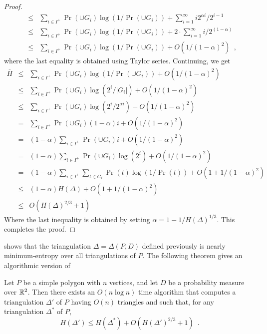 \documentclass[lotsofwhite]{patmorin}
\begin{document}
\begin{proof}
\begin{eqnarray*}
 & \le & \sum_{i\in I^+}\Pr(\cup G_{i})\log(1/\Pr(\cup G_{i})) 
         + \sum_{i=1}^\infty i2^{\alpha i}/2^{i-1} \\
 & \le & \sum_{i\in I^+}\Pr(\cup G_{i})\log(1/\Pr(\cup G_{i})) 
         + 2\cdot\sum_{i=1}^{\infty} i/2^{(1-\alpha)} \\
 & \le & \sum_{i\in I^+}\Pr(\cup G_{i})\log(1/\Pr(\cup G_{i})) 
         + O(1/(1-\alpha)^2) \enspace ,
\end{eqnarray*}
where the last equality is obtained using Taylor series.
Continuing, we get 
\begin{eqnarray*}
\overline H
  & \le & \sum_{i\in I^+}\Pr(\cup G_{i})\log(1/\Pr(\cup G_{i})) 
         + O(1/(1-\alpha)^2) \\
  & \le & \sum_{i\in I^+}\Pr(\cup G_{i})\log(2^i/|G_i|)
         + O(1/(1-\alpha)^2) \\
  & \le & \sum_{i\in I^+}\Pr(\cup G_{i})\log(2^i/2^{\alpha i})
         + O(1/(1-\alpha)^2) \\
  &  =  & \sum_{i\in I^+}\Pr(\cup G_{i})(1-\alpha) i
         + O(1/(1-\alpha)^2) \\
  &  =  & (1-\alpha)\sum_{i\in I^+}\Pr(\cup G_{i}) i
         + O(1/(1-\alpha)^2) \\
  &  =  & (1-\alpha)\sum_{i\in I^+}\Pr(\cup G_{i})\log(2^i)
         + O(1/(1-\alpha)^2) \\
  &  =  & (1-\alpha)\sum_{i\in I^+}\sum_{t\in G_i}\Pr(t)\log(1/\Pr(t))
         + O(1+1/(1-\alpha)^2) \\
  & \le & (1-\alpha)H(\Delta) + O(1+1/(1-\alpha)^2) \\
  & \le &  O(H(\Delta)^{2/3}+ 1)
\end{eqnarray*} 
Where the last inequality is obtained by setting 
$\alpha=1-1/H(\Delta)^{1/3}$.
This completes the proof.
\end{proof}

 shows that the triangulation
$\Delta=\Delta(P,D)$ defined previously is nearly minimum-entropy over
all triangulations of $P$.  The following theorem gives an algorithmic
version of 

\begin{thm}
Let $P$ be a simple polygon with $n$ vertices, and let $D$ be a
probability measure over $\mathbb{R}^2$.  Then there exists an $O(n\log n)$
time algorithm that computes a triangulation $\Delta'$ of $P$ having
$O(n)$ triangles and such that, for any triangulation $\Delta^*$ of
$P$,
\[
    H(\Delta') \le H(\Delta^*) + O(H(\Delta')^{2/3}+1) \enspace .
\]
\end{thm}
\end{document}
